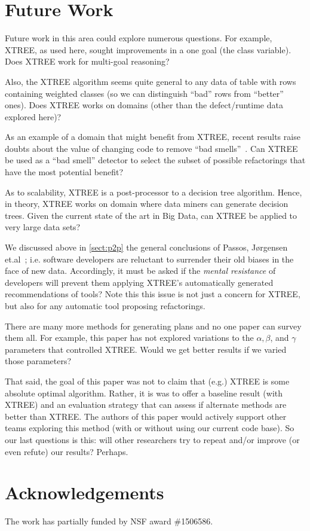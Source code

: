\documentclass{sig-alternate}
\newcommand{\tion}[1]{\textsection\ref{sect:#1}}
\begin{document}
\section{Future Work}
Future work in this area could explore numerous questions. For example, 
XTREE, as used here, sought improvements in a one goal (the class variable). Does XTREE work for multi-goal reasoning?

Also, the XTREE algorithm seems quite general to any data of table with rows containing
weighted classes (so we can distinguish ``bad'' rows from ``better'' ones). 
Does   XTREE works  on   domains (other than the defect/runtime data explored here)?

As an example of a domain that might benefit from XTREE, recent results raise doubts about
the value of changing code to remove ``bad smells''~\cite{Sjoberg13}. Can XTREE be used as a ``bad smell'' detector to select the subset of possible refactorings that have the most potential benefit?

As to scalability, XTREE is a post-processor to a decision tree algorithm. Hence, in theory, XTREE   works on domain where data miners can generate decision trees. Given the current state of the art in Big Data, can XTREE  be applied to  very large data sets?
 
We discussed above in \tion{p2p} the general  conclusions of Passos, J{\o}rgensen  et.al~\cite{passos11,jorgensen09};
i.e. software developers are reluctant to surrender their old biases
in the face of new data. 
Accordingly, it must be asked if  the {\em mental resistance} of developers
will prevent them applying XTREE's automatically generated recommendations of tools?
Note this this issue is not just a concern for XTREE, but also for any 
automatic tool proposing refactorings.

There are many more methods for generating plans and
no   one paper can survey them all. For example, this paper has not explored variations to the $\alpha,\beta$, and $\gamma$
parameters that controlled XTREE. Would we get better results if we varied those parameters?

That said, the goal of this paper was not to claim that (e.g.) XTREE is some absolute optimal algorithm. Rather, it is
was to offer a baseline result (with XTREE) and an  evaluation strategy that  can assess  if alternate methods are better than XTREE.
The authors of this paper would actively support other teams exploring this
method (with or without using our current code base). So our last questions is this:
will other  researchers try to repeat and/or improve
(or even refute) our results?  Perhaps.

\section*{Acknowledgements}
The work has partially funded by NSF  award \#1506586.



\balance

\end{document}
